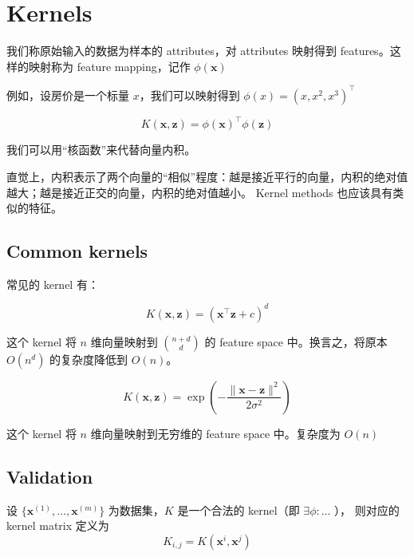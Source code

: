 \section{Kernels}
	\begin{df}
		我们称原始输入的数据为样本的 attributes，对 attributes 映射得到 features。这样的映射称为 feature mapping，记作 $ \phi(\bm{x}) $
	\end{df}
	例如，设房价是一个标量 $ x $，我们可以映射得到 $ \phi(x) = {\left( x, x^2, x^3  \right)} ^\intercal $
	
	\begin{df}
		\begin{equation*}
			K(\bm{x}, \bm{z}) = \phi(\bm{x})^\intercal \phi(\bm{z})
		\end{equation*}
	\end{df}
	我们可以用“核函数”来代替向量内积。
	
	直觉上，内积表示了两个向量的“相似”程度：越是接近平行的向量，内积的绝对值越大；越是接近正交的向量，内积的绝对值越小。
	Kernel methods 也应该具有类似的特征。
	
	\subsection{Common kernels}
		常见的 kernel 有：
		
		\begin{df}
			\begin{equation}
				K(\bm{x}, \bm{z}) = ( \bm{x}^\intercal \bm{z} + c )^d
			\end{equation}
		\end{df}
		这个 kernel 将 $ n $ 维向量映射到 $ \binom{n+d}{d} $ 的 feature space 中。换言之，将原本 $ O(n^d) $ 的复杂度降低到 $ O(n) $。
		
		\begin{df}
			\begin{equation}
				K(\bm{x}, \bm{z}) = \exp\left( - \frac{ \| \bm{x} - \bm{z} \|^2 }{2 \sigma^2} \right)
			\end{equation}
		\end{df}
		这个 kernel 将 $ n $ 维向量映射到无穷维的 feature space 中。复杂度为 $ O(n) $
		
	\subsection{Validation}
		\begin{df}
			设 $ \{ \bm{x}^{(1)}, \ldots, \bm{x}^{(m)} \} $ 为数据集，$ K $ 是一个合法的 kernel（即 $ \exists \phi: \ldots $ ），
			则对应的 kernel matrix 定义为
			\begin{equation*}
				K_{i,j} = K(\bm{x}^i, \bm{x}^j)
			\end{equation*}
		\end{df}
		
